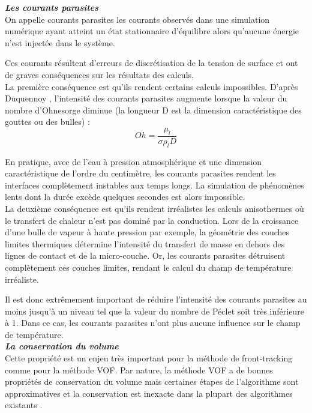 \textit{\textbf{Les courants parasites}}
\smallskip \\

On appelle courants parasites les courants observ\'es dans une simulation num\'erique
ayant atteint un \'etat stationnaire d'\'equilibre alors qu'aucune \'energie n'est inject\'ee dans le syst\`eme.

Ces courants r\'esultent d'erreurs de discr\'etisation de la tension de surface
et ont de graves cons\'equences sur les r\'esultats des calculs.\\

La première cons\'equence est qu'ils rendent certains calculs impossibles.
D'apr\`es Duquennoy \cite{Duquennoy2000}, l'intensit\'e des courants parasites augmente lorsque
la valeur du nombre d'Ohnesorge diminue (la longueur D est la dimension caract\'eristique des gouttes ou des bulles) :
\begin{equation}
  Oh = \dfrac{\mu_{l}}{\sigma \rho_{l} D}
\end{equation}

En pratique, avec de l'eau \`a pression atmosph\'erique et une dimension caract\'eristique de l'ordre du centim\`etre,
les courants parasites rendent les interfaces compl\`etement instables aux temps longs.
La simulation de ph\'enom\`enes lents dont la dur\'ee exc\`ede quelques secondes est alors impossible.\\

La deuxi\`eme cons\'equence est qu'ils rendent irr\'ealistes les calculs anisothermes
o\`u le transfert de chaleur n'est pas domin\'e par la conduction.
Lors de la croissance d'une bulle de vapeur \`a haute pression par exemple,
la g\'eom\'etrie des couches limites thermiques d\'etermine l'intensit\'e du transfert de masse
en dehors des lignes de contact et de la micro-couche.
Or, les courants parasites d\'etruisent complètement ces couches limites,
rendant le calcul du champ de temp\'erature irr\'ealiste.

Il est donc extr\^emement important de r\'eduire l'intensit\'e des courants parasites au moins jusqu'\`a
un niveau tel que la valeur du nombre de P\'eclet soit tr\`es inf\'erieure \`a 1.
Dans ce cas, les courants parasites n'ont plus aucune influence sur le champ de temp\'erature.
\smallskip \\

\textit{\textbf{La conservation du volume}}
\smallskip \\

Cette propri\'et\'e est un enjeu tr\`es important pour la m\'ethode de front-tracking comme pour la m\'ethode VOF.
Par nature, la m\'ethode VOF a de bonnes propri\'et\'es de conservation du volume
mais certaines \'etapes de l'algorithme sont approximatives
et la conservation est inexacte dans la plupart des algorithmes existants \cite{Aulisa2003}.

